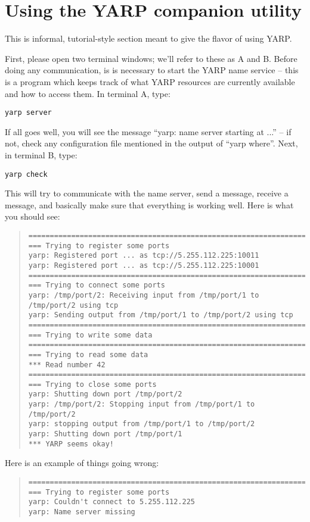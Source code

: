 

\chapter{Using the YARP companion utility}

\label{sect:using-utility}

This is informal, tutorial-style section meant to give the flavor
of using YARP.

First, please
open two terminal windows; we'll refer to these as A and B.
%
Before doing any communication, is is necessary to start the YARP name
service -- this is a program which keeps track of what YARP resources
are currently available and how to access them.
%
In terminal A, type:

\begin{verbatim}
yarp server
\end{verbatim}

If all goes well, you will see the message ``yarp: name server starting at ...'' -- if not, check any configuration file
mentioned in the output of ``yarp where''.
%
Next, in terminal B, type:
%
\begin{verbatim}
yarp check
\end{verbatim}
%
This will try to communicate with the name server, send a message,
receive a message, and basically make sure that everything is
working well.  Here is what you should see:

\begin{quote}
{\small
\begin{verbatim}
==================================================================
=== Trying to register some ports
yarp: Registered port ... as tcp://5.255.112.225:10011
yarp: Registered port ... as tcp://5.255.112.225:10001
==================================================================
=== Trying to connect some ports
yarp: /tmp/port/2: Receiving input from /tmp/port/1 to /tmp/port/2 using tcp
yarp: Sending output from /tmp/port/1 to /tmp/port/2 using tcp
==================================================================
=== Trying to write some data
==================================================================
=== Trying to read some data
*** Read number 42
==================================================================
=== Trying to close some ports
yarp: Shutting down port /tmp/port/2
yarp: /tmp/port/2: Stopping input from /tmp/port/1 to /tmp/port/2
yarp: stopping output from /tmp/port/1 to /tmp/port/2
yarp: Shutting down port /tmp/port/1
*** YARP seems okay!
\end{verbatim}
}
\end{quote}
%
\noindent
Here is an example of things going wrong:
%
\begin{quote}
{\small
\begin{verbatim}
==================================================================
=== Trying to register some ports
yarp: Couldn't connect to 5.255.112.225
yarp: Name server missing
\end{verbatim}
}
\end{quote}

